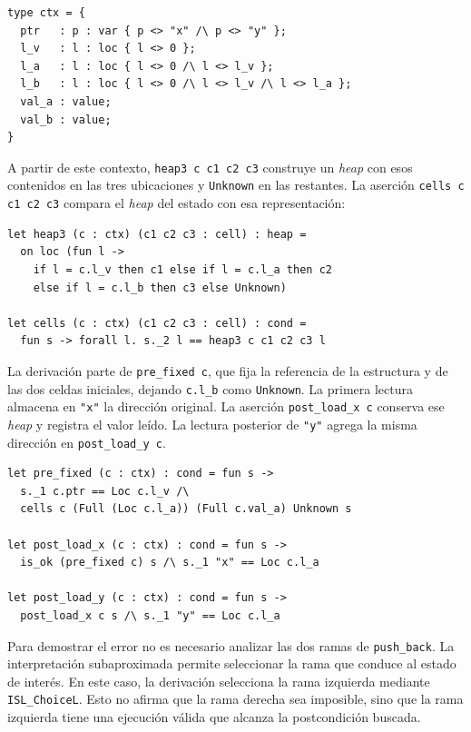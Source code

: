 \documentclass[a4paper,	11pt]{report}
\begin{document}
\begin{lstlisting}
type ctx = {
  ptr   : p : var { p <> "x" /\ p <> "y" };
  l_v   : l : loc { l <> 0 };
  l_a   : l : loc { l <> 0 /\ l <> l_v };
  l_b   : l : loc { l <> 0 /\ l <> l_v /\ l <> l_a };
  val_a : value;
  val_b : value;
}
\end{lstlisting}

A partir de este contexto,
\lstinline|heap3 c c1 c2 c3| construye un \emph{heap} con esos contenidos en las tres ubicaciones y \lstinline|Unknown| en las restantes.
La aserción \lstinline|cells c c1 c2 c3| compara el \emph{heap} del estado con esa representación:

\begin{lstlisting}
let heap3 (c : ctx) (c1 c2 c3 : cell) : heap =
  on loc (fun l ->
    if l = c.l_v then c1 else if l = c.l_a then c2
    else if l = c.l_b then c3 else Unknown)

let cells (c : ctx) (c1 c2 c3 : cell) : cond =
  fun s -> forall l. s._2 l == heap3 c c1 c2 c3 l
\end{lstlisting}

La derivación parte de \lstinline|pre_fixed c|,
que fija la referencia de la estructura y de las dos celdas iniciales,
dejando \lstinline|c.l_b| como \lstinline|Unknown|.
La primera lectura almacena en \lstinline|"x"| la dirección original.
La aserción \lstinline|post_load_x c| conserva ese \emph{heap} y registra el valor leído.
La lectura posterior de \lstinline|"y"| agrega la misma dirección en \lstinline|post_load_y c|.

\begin{lstlisting}
let pre_fixed (c : ctx) : cond = fun s ->
  s._1 c.ptr == Loc c.l_v /\
  cells c (Full (Loc c.l_a)) (Full c.val_a) Unknown s

let post_load_x (c : ctx) : cond = fun s ->
  is_ok (pre_fixed c) s /\ s._1 "x" == Loc c.l_a

let post_load_y (c : ctx) : cond = fun s ->
  post_load_x c s /\ s._1 "y" == Loc c.l_a
\end{lstlisting}

Para demostrar el error no es necesario analizar las dos ramas de \lstinline|push_back|.
La interpretación subaproximada permite seleccionar la rama que conduce al estado de interés.
En este caso,
la derivación selecciona la rama izquierda mediante \lstinline|ISL_ChoiceL|.
Esto no afirma que la rama derecha sea imposible,
sino que la rama izquierda tiene una ejecución válida que alcanza la postcondición buscada.
\end{document}
